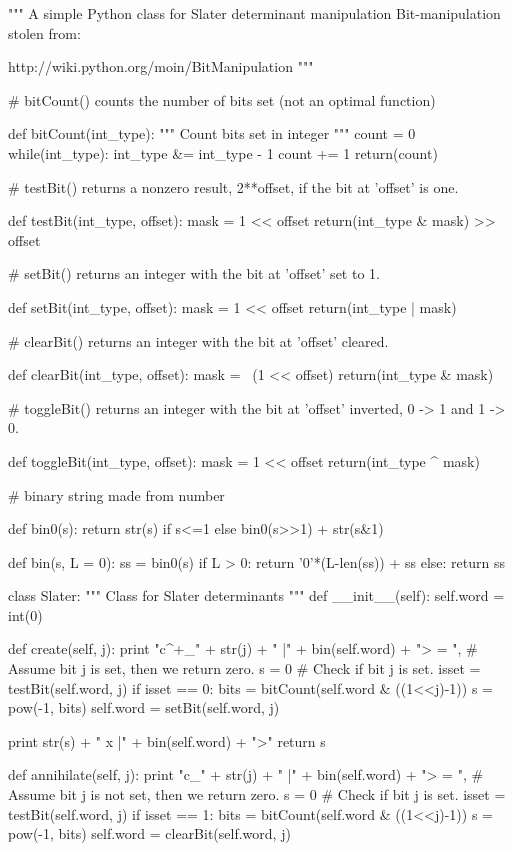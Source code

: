 \documentclass[%
twoside,                 %
final,                   %
10pt]{article}
\begin{document}
"""
A simple Python class for Slater determinant manipulation
Bit-manipulation stolen from:

http://wiki.python.org/moin/BitManipulation
"""

# bitCount() counts the number of bits set (not an optimal function)

def bitCount(int_type):
    """ Count bits set in integer """
    count = 0
    while(int_type):
        int_type &= int_type - 1
        count += 1
    return(count)


# testBit() returns a nonzero result, 2**offset, if the bit at 'offset' is one.

def testBit(int_type, offset):
    mask = 1 << offset
    return(int_type & mask) >> offset

# setBit() returns an integer with the bit at 'offset' set to 1.

def setBit(int_type, offset):
    mask = 1 << offset
    return(int_type | mask)

# clearBit() returns an integer with the bit at 'offset' cleared.

def clearBit(int_type, offset):
    mask = ~(1 << offset)
    return(int_type & mask)

# toggleBit() returns an integer with the bit at 'offset' inverted, 0 -> 1 and 1 -> 0.

def toggleBit(int_type, offset):
    mask = 1 << offset
    return(int_type ^ mask)

# binary string made from number

def bin0(s):
    return str(s) if s<=1 else bin0(s>>1) + str(s&1)

def bin(s, L = 0):
    ss = bin0(s)
    if L > 0:
        return '0'*(L-len(ss)) + ss
    else:
        return ss
    
    

class Slater:
    """ Class for Slater determinants """
    def __init__(self):
        self.word = int(0)

    def create(self, j):
        print "c^+_" + str(j) + " |" + bin(self.word) + ">  = ",
        # Assume bit j is set, then we return zero.
        s = 0
        # Check if bit j is set.
        isset = testBit(self.word, j)
        if isset == 0:
            bits = bitCount(self.word & ((1<<j)-1))
            s = pow(-1, bits)
            self.word = setBit(self.word, j)

        print str(s) + " x |" + bin(self.word) + ">"
        return s
        
    def annihilate(self, j):
        print "c_" + str(j) + " |" + bin(self.word) + ">  = ",
        # Assume bit j is not set, then we return zero.
        s = 0
        # Check if bit j is set.
        isset = testBit(self.word, j)
        if isset == 1:
            bits = bitCount(self.word & ((1<<j)-1))
            s = pow(-1, bits)
            self.word = clearBit(self.word, j)
\end{document}
